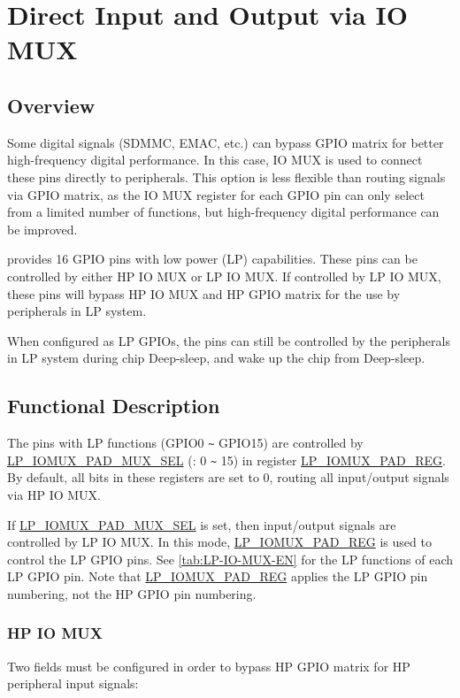 \documentclass[main\_\_EN.tex]{subfiles}
\begin{document}
\section{Direct Input and Output via IO MUX}

\subsection{Overview}

Some digital signals (SDMMC, EMAC, etc.) can bypass GPIO matrix for better high-frequency digital performance. In this case, IO MUX is used to connect these pins directly to peripherals. This option is less flexible than routing signals via GPIO matrix, as the IO MUX register for each GPIO pin can only select from a limited number of functions, but high-frequency digital performance can be improved.

\chipname{} provides 16 GPIO pins with low power (LP) capabilities. These pins can be controlled by either HP IO MUX or LP IO MUX. If controlled by LP IO MUX, these pins will bypass HP IO MUX and HP GPIO matrix for the use by peripherals in LP system.

When configured as LP GPIOs, the pins can still be controlled by the peripherals in LP system during chip Deep-sleep, and wake up the chip from Deep-sleep.

\subsection{Functional Description}

The pins with LP functions (GPIO0 \verb+~+ GPIO15) are controlled by \hyperref[fielddesc:LPIOMUXPADNMUXSEL] {LP\_IOMUX\_PAD\_MUX\_SEL} (: 0 \verb+~+ 15) in register \hyperref[regdesc:LPIOMUXPADNREG]{LP\_IOMUX\_PAD\_REG}. By default, all bits in these registers are set to 0, routing all input/output signals via HP IO MUX.

If \hyperref[fielddesc:LPIOMUXPADNMUXSEL]{LP\_IOMUX\_PAD\_MUX\_SEL} is set, then input/output signals are controlled by LP IO MUX. In this mode, \hyperref[regdesc:LPIOMUXPADNREG]{LP\_IOMUX\_PAD\_REG} is used to control the LP GPIO pins. See  \ref{tab:LP-IO-MUX-EN} for the LP functions of each LP GPIO pin. Note that  \hyperref[regdesc:LPIOMUXPADNREG]{LP\_IOMUX\_PAD\_REG} applies the LP GPIO pin numbering, not the HP GPIO pin numbering.

\subsubsection{HP IO MUX}
Two fields must be configured in order to bypass HP GPIO matrix for HP peripheral input signals:
\end{document}
